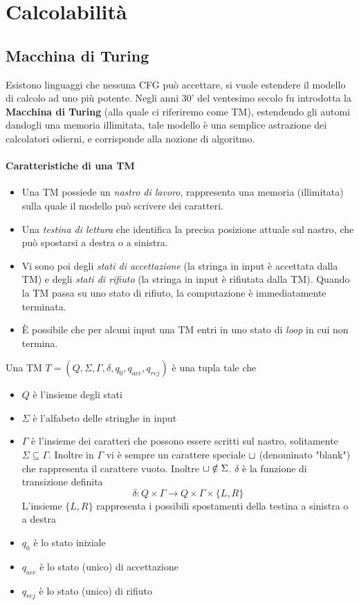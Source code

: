 \documentclass[10pt, letterpaper]{report}
\begin{document}
\chapter{Calcolabilità}
\section{Macchina di Turing}
Esistono linguaggi che nessuna CFG può accettare, si vuole estendere il modello di calcolo ad uno più 
potente. Negli anni 30' del ventesimo secolo fu introdotta la \textbf{Macchina di Turing} (alla quale ci 
riferiremo come TM), estendendo gli automi dandogli una memoria illimitata, tale modello è una semplice 
astrazione dei calcolatori odierni, e corrisponde alla nozione di algoritmo.\subsubsection{Caratteristiche di una TM}\begin{itemize}
    \item Una TM possiede un \textit{nastro di lavoro}, rappresenta una memoria (illimitata) sulla quale il modello 
    può scrivere dei caratteri. 
    \item Una \textit{testina di lettura} che identifica la precisa posizione attuale sul nastro, che può spostarsi 
    a destra o a sinistra. 
    \item Vi sono poi degli \textit{stati di accettazione} (la stringa in input è accettata dalla TM) e degli 
    \textit{stati di rifiuto} (la stringa in input è rifiutata dalla TM). Quando la TM passa su uno stato di rifiuto, 
    la computazione è immediatamente terminata. 
    \item È possibile che per alcuni input una TM entri in uno stato di \textit{loop} in cui non termina.
\end{itemize}
 Una TM $T=(Q,\Sigma,\Gamma,\delta,q_0,q_{acc},q_{rej})$ è una tupla tale che \begin{itemize}
    \item $Q$ è l'insieme degli stati 
    \item $\Sigma$ è l'alfabeto delle stringhe in input 
    \item $\Gamma$ è l'insieme dei caratteri che possono essere scritti sul nastro, solitamente $\Sigma\subseteq \Gamma$. Inoltre 
    in $\Gamma$ vi è sempre un carattere speciale ${\sqcup}$ (denominato "blank") che rappresenta il carattere vuoto.
    Inoltre ${\sqcup}\notin\Sigma$.
    $\delta$ è la funzione di transizione definita $$ \delta : Q\times \Gamma \rightarrow Q\times \Gamma \times \{L,R\}$$
    L'insieme $\{L,R\}$ rappresenta i possibili spostamenti della testina a sinistra o a destra
    \item $q_0$ è lo stato iniziale 
    \item  $q_{acc}$ è lo stato (unico) di accettazione 
    \item $q_{rej}$ è lo stato (unico) di rifiuto 
\end{itemize}
\end{document}
